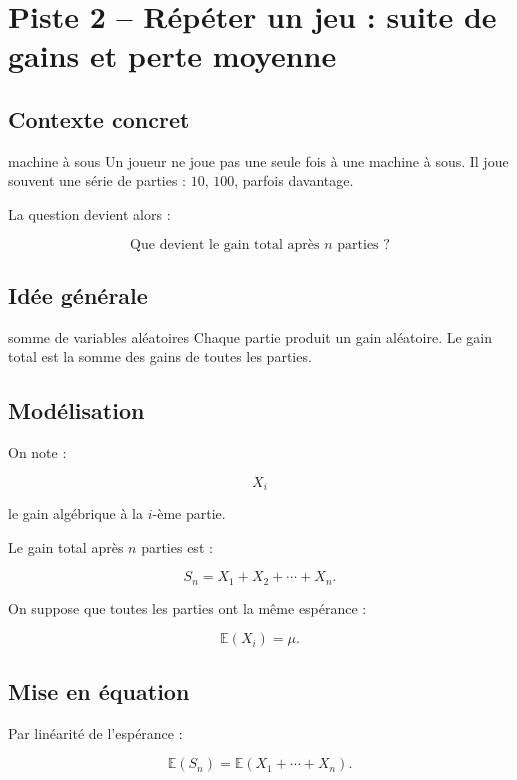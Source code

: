 \documentclass[11pt,a4paper]{article}
\newcommand{\E}{\mathbb{E}}
\begin{document}
\section{Piste 2 -- Répéter un jeu : suite de gains et perte moyenne}

\subsection{Contexte concret}

\begin{contexte}{machine à sous}
Un joueur ne joue pas une seule fois à une machine à sous. Il joue souvent une série de parties : $10$, $100$, parfois davantage.

La question devient alors :

\[
\text{Que devient le gain total après }n\text{ parties ?}
\]
\end{contexte}

\subsection{Idée générale}

\begin{idee}{somme de variables aléatoires}
Chaque partie produit un gain aléatoire. Le gain total est la somme des gains de toutes les parties.
\end{idee}

\subsection{Modélisation}

On note :

\[
X_i
\]

le gain algébrique à la $i$-ème partie.

Le gain total après $n$ parties est :

\[
S_n=X_1+X_2+\cdots+X_n.
\]

On suppose que toutes les parties ont la même espérance :

\[
\E(X_i)=\mu.
\]

\subsection{Mise en équation}

Par linéarité de l'espérance :

\[
\E(S_n)=\E(X_1+\cdots+X_n).
\]
\end{document}
